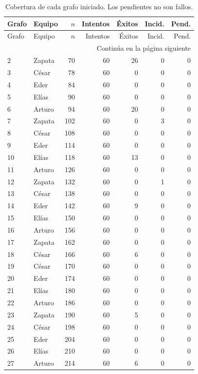 \small\begin{longtable}{llrrrrr}
\caption{Cobertura de cada grafo iniciado. Los pendientes no son fallos.}\label{tab:allgraphs}\\
\toprule Grafo & Equipo & $n$ & Intentos & Éxitos & Incid. & Pend. \\ \midrule\endfirsthead
\toprule Grafo & Equipo & $n$ & Intentos & Éxitos & Incid. & Pend. \\ \midrule\endhead
\midrule\multicolumn{7}{r}{Continúa en la página siguiente}\endfoot\bottomrule\endlastfoot
1 & Arturo & 66 & 60 & 0 & 0 & 0 \\
2 & Zapata & 70 & 60 & 26 & 0 & 0 \\
3 & César & 78 & 60 & 0 & 0 & 0 \\
4 & Eder & 84 & 60 & 0 & 0 & 0 \\
5 & Elías & 90 & 60 & 0 & 0 & 0 \\
6 & Arturo & 94 & 60 & 20 & 0 & 0 \\
7 & Zapata & 102 & 60 & 0 & 3 & 0 \\
8 & César & 108 & 60 & 0 & 0 & 0 \\
9 & Eder & 114 & 60 & 0 & 0 & 0 \\
10 & Elías & 118 & 60 & 13 & 0 & 0 \\
11 & Arturo & 126 & 60 & 0 & 0 & 0 \\
12 & Zapata & 132 & 60 & 0 & 1 & 0 \\
13 & César & 138 & 60 & 0 & 0 & 0 \\
14 & Eder & 142 & 60 & 9 & 0 & 0 \\
15 & Elías & 150 & 60 & 0 & 0 & 0 \\
16 & Arturo & 156 & 60 & 0 & 0 & 0 \\
17 & Zapata & 162 & 60 & 0 & 0 & 0 \\
18 & César & 166 & 60 & 6 & 0 & 0 \\
19 & César & 170 & 60 & 0 & 0 & 0 \\
20 & Eder & 174 & 60 & 0 & 0 & 0 \\
21 & Elías & 180 & 60 & 0 & 0 & 0 \\
22 & Arturo & 186 & 60 & 0 & 0 & 0 \\
23 & Zapata & 190 & 60 & 5 & 0 & 0 \\
24 & César & 198 & 60 & 0 & 0 & 0 \\
25 & Eder & 204 & 60 & 0 & 0 & 0 \\
26 & Elías & 210 & 60 & 0 & 0 & 0 \\
27 & Arturo & 214 & 60 & 6 & 0 & 0 \\

\end{longtable}
